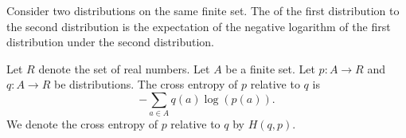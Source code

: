 


Consider two distributions
on the same finite set.
The 
of the first distribution
 to the
second distribution
is the expectation of the
negative logarithm of the first distribution
under the second distribution.


Let $R$ denote the set of
real numbers. Let
$A$ be a finite set.
Let $p: A \to R$ and
$q: A \to R$ be distributions.
The cross entropy of $p$ relative to $q$
is
\[
  -\sum_{a \in A} q(a) \log(p(a)).
\]
We denote the cross entropy
of $p$ relative to $q$ by
$H(q, p)$.
